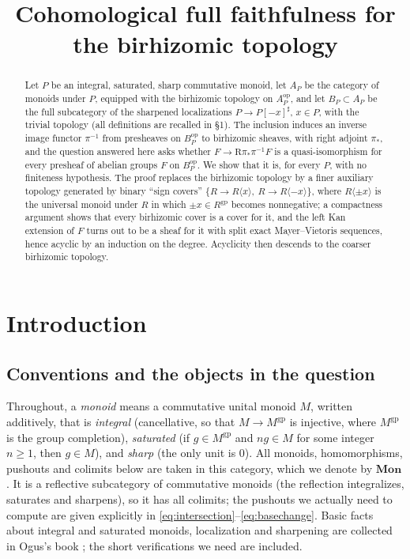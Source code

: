 \documentclass[12pt]{article}
\title{Cohomological full faithfulness for the birhizomic topology}
\author{}
\date{}
\newcommand{\gp}{\mathrm{gp}}
\newcommand{\R}{\mathrm R}
\theoremstyle{definition}
\theoremstyle{remark}
\begin{document}
\maketitle

\begin{abstract}
Let \(P\) be an integral, saturated, sharp commutative monoid, let \(A_P\) be
the category of monoids under \(P\), equipped with the birhizomic topology on
\(A_P^{\mathrm{op}}\), and let \(B_P\subset A_P\) be the full subcategory of
the sharpened localizations \(P\to P[-x]^\sharp\), \(x\in P\), with the
trivial topology (all definitions are recalled in \S1).  The inclusion
induces an inverse image functor \(\pi^{-1}\) from presheaves on
\(B_P^{\mathrm{op}}\) to birhizomic sheaves, with right adjoint \(\pi_*\),
and the question answered here asks whether \(F\to\R\pi_*\pi^{-1}F\) is a
quasi-isomorphism for every presheaf of abelian groups \(F\) on
\(B_P^{\mathrm{op}}\).  We show that it is, for every \(P\), with no
finiteness hypothesis.  The proof replaces the birhizomic topology by a
finer auxiliary topology generated by binary ``sign covers''
\(\{R\to R\langle x\rangle,\ R\to R\langle -x\rangle\}\), where
\(R\langle \pm x\rangle\) is the universal monoid under \(R\) in which
\(\pm x\in R^{\gp}\) becomes nonnegative; a compactness argument shows that
every birhizomic cover is a cover for it, and the left Kan extension of
\(F\) turns out to be a sheaf for it with split exact Mayer--Vietoris
sequences, hence acyclic by an induction on the degree.  Acyclicity then
descends to the coarser birhizomic topology.
\end{abstract}

\section{Introduction}

\subsection{Conventions and the objects in the question}
\label{sec:conventions}

Throughout, a \emph{monoid} means a commutative unital monoid \(M\), written
additively, that is
\emph{integral} (cancellative, so that \(M\to M^{\gp}\) is injective, where
\(M^{\gp}\) is the group completion),
\emph{saturated} (if \(g\in M^{\gp}\) and \(ng\in M\) for some integer
\(n\ge1\), then \(g\in M\)), and
\emph{sharp} (the only unit is \(0\)).
All monoids, homomorphisms, pushouts and colimits below are taken in this
category, which we denote by \(\mathbf{Mon}\).  It is a reflective
subcategory of commutative monoids (the reflection integralizes, saturates
and sharpens), so it has all colimits; the pushouts we actually need to
compute are given explicitly in
\eqref{eq:intersection}--\eqref{eq:basechange}.  Basic facts about
integral and saturated monoids, localization and sharpening are collected in
Ogus's book \cite[Ch.~I, \S\S1.3--1.4]{ogus}; the short verifications we need
are included.
\end{document}
